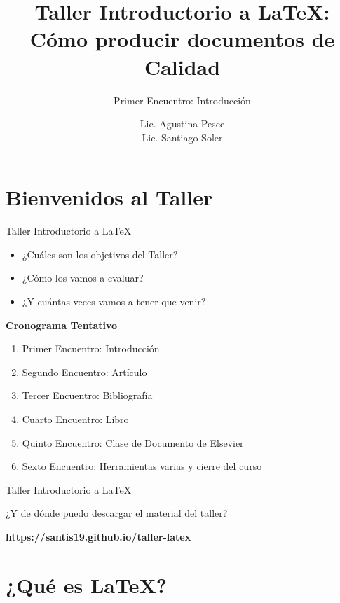 \documentclass[11pt]{beamer}
\author{Lic. Agustina Pesce \\ Lic. Santiago Soler}
\title[Taller de {\LaTeX}]{Taller Introductorio a {\LaTeX}: \\ Cómo producir documentos de Calidad}
\subtitle{Primer Encuentro: Introducción}
\date{}
\begin{document}
\maketitle

\section{Bienvenidos al Taller}

\begin{frame}{Taller Introductorio a {\LaTeX}}
\begin{itemize}[<+- | alert@+>] %
  \item ¿Cuáles son los objetivos del Taller?
  \item ¿Cómo los vamos a evaluar?
  \item ¿Y cuántas veces vamos a tener que venir?
\end{itemize}

\pause
\textbf{Cronograma Tentativo}


\begin{enumerate}
  \item Primer Encuentro: Introducción
  \item Segundo Encuentro: Artículo
  \item Tercer Encuentro: Bibliografía
  \item Cuarto Encuentro: Libro
  \item Quinto Encuentro: Clase de Documento de Elsevier
  \item Sexto Encuentro: Herramientas varias y cierre del curso
\end{enumerate}

\end{frame}

\begin{frame}{Taller Introductorio a {\LaTeX}}
\begin{center}
¿Y de dónde puedo descargar el material del taller?
\end{center}
\begin{center}
\textbf{https://santis19.github.io/taller-latex}
\end{center}
\end{frame}

\section{¿Qué es {\LaTeX}?}
\end{document}
